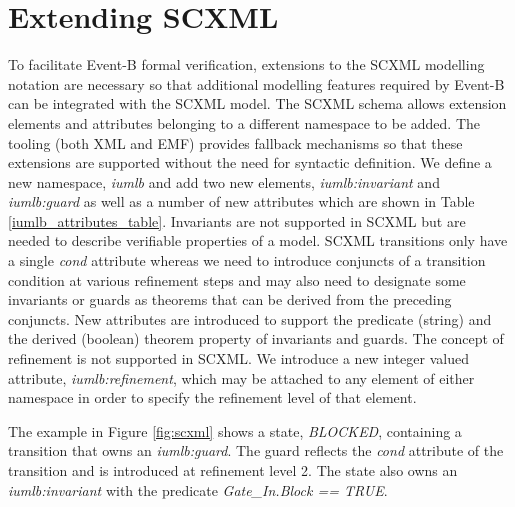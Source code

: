 
\section{Extending SCXML}
\label{sect:extension}


To facilitate Event-B formal verification, extensions to the SCXML 
modelling notation are necessary so that additional modelling features 
required by Event-B can be integrated with the SCXML model.
The SCXML schema allows extension elements and attributes belonging 
to a different namespace to be added. The tooling (both XML and EMF) 
provides fallback mechanisms so that these extensions are supported 
without the need for syntactic definition. We define a new namespace,  
\emph{iumlb} and add two new elements, \emph{iumlb:invariant} and 
\emph{iumlb:guard} as well as a 
number of new attributes which are shown in Table \ref{iumlb_attributes_table}.
Invariants are not supported in SCXML but are needed to describe 
verifiable properties of a model. SCXML transitions only have a single 
\emph{cond} attribute whereas we need to introduce conjuncts of a transition
condition at various refinement steps and may also need to designate some 
invariants or guards as theorems that can be derived from the preceding conjuncts. 
New attributes are introduced to support the predicate (string) and the 
derived (boolean) theorem property of invariants and guards. The concept 
of refinement is not supported in SCXML. We introduce a new integer valued 
attribute, \emph{iumlb:refinement}, which may be attached to any element of 
either namespace in order to specify the refinement level of that element. 


The example in Figure \ref{fig:scxml} shows a state, \emph{BLOCKED}, 
containing a transition that owns an \emph{iumlb:guard}.
The guard reflects the \emph{cond} attribute of the transition 
and is introduced at refinement level 2. 
The state also owns an \emph{iumlb:invariant} with the predicate
 \emph{Gate\_In.Block == TRUE}.




